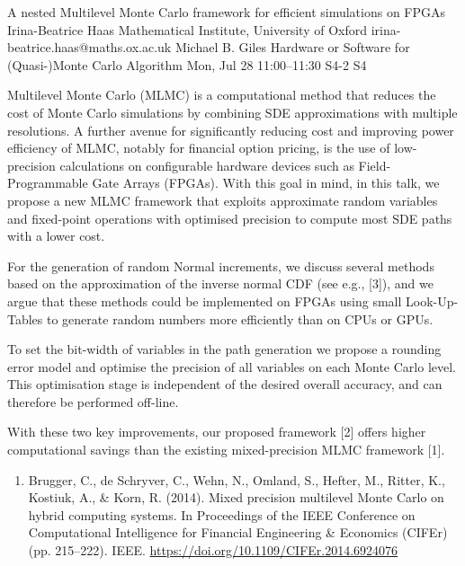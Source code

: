 \begin{talk}
  {A nested Multilevel Monte Carlo framework for efficient simulations on FPGAs}%
  {Irina-Beatrice Haas}%
  {Mathematical Institute, University of Oxford}%
  {irina-beatrice.haas@maths.ox.ac.uk}%
  {Michael B. Giles}%
  {Hardware or Software for (Quasi-)Monte Carlo Algorithm}%
  {Mon, Jul 28 11:00--11:30}%
  {S4-2}%
  {S4}%
    
   

Multilevel Monte Carlo (MLMC) is a computational method that reduces the cost of Monte Carlo simulations by combining SDE approximations with multiple resolutions. A further avenue for significantly reducing cost and improving power efficiency of MLMC, notably for financial option pricing, is the use of low-precision calculations on configurable hardware devices such as Field-Programmable Gate Arrays (FPGAs). With this goal in mind, in this talk, we propose a new MLMC framework that exploits approximate random variables and fixed-point operations with optimised precision to compute most SDE paths with a lower cost.

For the generation of random Normal increments, we discuss several methods based on the approximation of the inverse normal CDF (see e.g., [3]), and we argue that these methods could be implemented on FPGAs using small Look-Up-Tables to generate random numbers more efficiently than on CPUs or GPUs. 

To set the bit-width of variables in the path generation we propose a rounding error model and optimise the precision of all variables on each Monte Carlo level. This optimisation stage is independent of the desired overall accuracy, and can therefore be performed off-line. 

With these two key improvements, our proposed framework [2] offers higher computational
savings than the existing mixed-precision MLMC framework [1].


\medskip


\begin{enumerate}

    \item[{[1]}] Brugger, C., de Schryver, C., Wehn, N., Omland, S., Hefter, M., Ritter, K., Kostiuk, A., \& Korn, R. (2014). Mixed precision multilevel Monte Carlo on hybrid computing systems. In Proceedings of the IEEE Conference on Computational Intelligence for Financial Engineering \& Economics (CIFEr) (pp. 215--222). IEEE. \url{https://doi.org/10.1109/CIFEr.2014.6924076}
    

\end{enumerate}
\end{talk}
